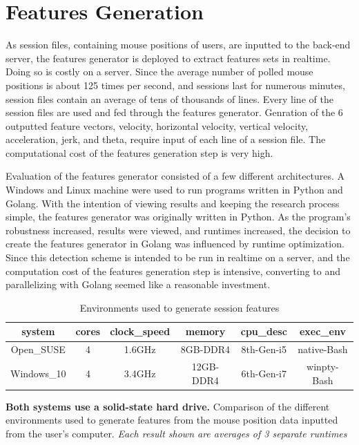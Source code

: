 
\section{Features Generation}\label{sec:evaluation-features-generation}
As session files, containing mouse positions of users, are inputted to the back-end server, the features generator is deployed to extract features sets in realtime. Doing so is costly on a server. Since the average number of polled mouse positions is about 125 times per second, and sessions last for numerous minutes, session files contain an average of tens of thousands of lines. Every line of the session files are used and fed through the features generator. Genration of the 6 outputted feature vectors, velocity, horizontal velocity, vertical velocity, acceleration, jerk, and theta, require input of each line of a session file. The computational cost of the features generation step is very high.

Evaluation of the features generator consisted of a few different architectures. A Windows and Linux machine were used to run programs written in Python and Golang. With the intention of viewing results and keeping the research process simple, the features generator was originally written in Python. As the program's robustness increased, results were viewed, and runtimes increased, the decision to create the features generator in Golang was influenced by runtime optimization. Since this detection scheme is intended to be run in realtime on a server, and the computation cost of the features generation step is intensive, converting to and parallelizing with Golang seemed like a reasonable investment.

\begin{table}[h!]
    \centering
    \begin{tabular}{ |c|c|c|c|c|c| }
        \hline
        \textbf{system} & \textbf{cores} & \textbf{clock{\_}speed} & \textbf{memory} & \textbf{cpu{\_}desc} & \textbf{exec{\_}env} \\
        \hline
        Open{\_}SUSE & 4 & 1.6GHz & 8GB-DDR4 & 8th-Gen-i5 & native-Bash \\
        Windows{\_}10 & 4 & 3.4GHz & 12GB-DDR4 & 6th-Gen-i7 & winpty-Bash \\
        \hline
    \end{tabular}
    \caption{Environments used to generate session features}
    {\small \textbf{Both systems use a solid-state hard drive.} Comparison of the different environments used to generate features from the mouse position data inputted from the user's computer. \textit{Each result shown are averages of 3 separate runtimes}}
\end{table}

